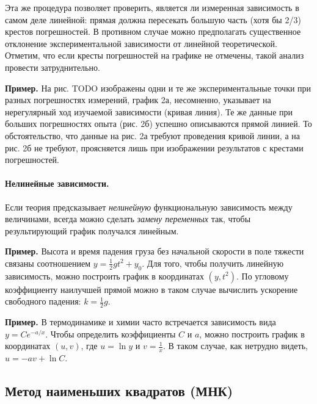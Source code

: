 \documentclass[10pt]{article}
\begin{document}
Эта же процедура позволяет проверить, является ли измеренная зависимость
в самом деле линейной: прямая должна пересекать большую часть (хотя
бы 2/3) крестов погрешностей. В противном случае можно предполагать
существенное отклонение экспериментальной зависимости от линейной
теоретической. Отметим, что если кресты погрешностей на графике не
отмечены, такой анализ провести затруднительно. 

\textbf{\footnotesize{}Пример.}{\footnotesize{} На рис. TODO изображены
одни и те же экспериментальные точки при разных погрешностях измерений,
график 2а, несомненно, указывает на нерегулярный ход изучаемой зависимости
(кривая линия). Те же данные при больших погрешностях опыта (рис.
2б) успешно описываются прямой линией. То обстоятельство, что данные
на рис. 2а требуют проведения кривой линии, а на рис. 2б не требуют,
проясняется лишь при изображении результатов с крестами погрешностей.}{\footnotesize\par}

\paragraph{Нелинейные зависимости.}

Если теория предсказывает \emph{нелинейную }функциональную зависимость
между величинами, всегда можно сделать \emph{замену переменных} так,
чтобы результирующий график получался линейным.

\textbf{\footnotesize{}Пример.}{\footnotesize{} Высота и время падения
груза без начальной скорости в поле тяжести связаны соотношением $y=\frac{1}{2}gt^{2}+y_{0}$.
Для того, чтобы получить линейную зависимость, можно построить график
в координатах $\left(y,t^{2}\right)$. По угловому коэффициенту наилучшей
прямой можно в таком случае вычислить ускорение свободного падения:
$k=\frac{1}{2}g$.}{\footnotesize\par}

\textbf{\footnotesize{}Пример.}{\footnotesize{} В термодинамике и
химии часто встречается зависимость вида $y=Ce^{-a/x}$. Чтобы определить
коэффициенты $C$ и $a$, можно построить график в координатах $(u,v)$,
где $u=\ln y$ и $v=\frac{1}{x}$. В таком случае, как нетрудно видеть,
$u=-av+\ln C$.}{\footnotesize\par}

\subsection{Метод наименьших квадратов (МНК)\label{subsec:MNK}}
\end{document}
